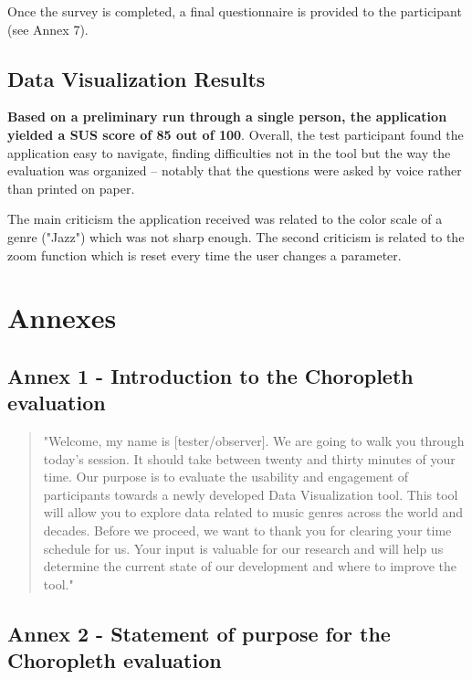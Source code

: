 \documentclass[twocolumn, letterpaper,13pt]{scrartcl}
\begin{document}
    Once the survey is completed, a final questionnaire is provided to the participant (see Annex 7).

    \subsection{Data Visualization Results}
    
    \textbf{Based on a preliminary run through a single person, the application yielded a SUS score of 85 out of 100}. Overall, the test participant found the application easy to navigate, finding difficulties not in the tool but the way the evaluation was organized -- notably that the questions were asked by voice rather than printed on paper.
    
    The main criticism the application received was related to the color scale of a genre ("Jazz") which was not sharp enough. The second criticism is related to the zoom function which is reset every time the user changes a parameter.  
    \clearpage
    \section*{Annexes}

    \subsection*{Annex 1 - Introduction to the Choropleth evaluation}
    
    \begin{quote}
        "Welcome, my name is [tester/observer]. We are going to walk you through today's session. It should take between twenty and thirty minutes of your time. Our purpose is to evaluate the usability and engagement of participants towards a newly developed Data Visualization tool. This tool will allow you to explore data related to music genres across the world and decades.
        \newline\newline
        Before we proceed, we want to thank you for clearing your time schedule for us. Your input is valuable for our research and will help us determine the current state of our development and where to improve the tool."
    \end{quote}
    
    \subsection*{Annex 2 - Statement of purpose for the Choropleth evaluation}
    
\end{document}

